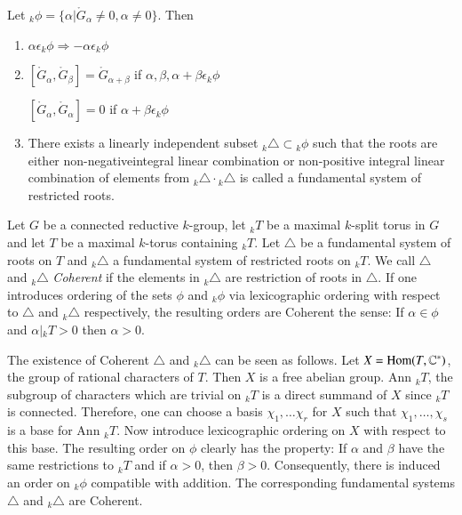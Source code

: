 \begin{thm}\label{chap0:thm0.11} %
  Let ${}_k \phi= \{ \alpha \big| \ring{G}_\alpha \neq 0, \alpha \neq 0
  \}$. Then
  \begin{enumerate}[\rm 1.]
    \item $\alpha \epsilon_k \phi \Rightarrow - \alpha
      \epsilon_k \phi$
      \item $\left[\ring{G}_\alpha, \ring{G}_\beta \right] =
        \ring{G}_{\alpha + \beta}$ if $\alpha, \beta, \alpha + \beta
        \epsilon_k \phi$

        $\left[\ring{G}_\alpha, \ring{G}_\alpha \right]=0$ if $\alpha
        + \beta \epsilon_k \phi$
        \item There exists a linearly independent subset ${}_k
          \triangle \subset {}_k \phi$ such that the roots are either
          non-negative\pageoriginale integral linear combination or non-positive
          integral linear combination of elements from ${}_k \triangle
          \cdot {}_k \triangle$ is called a fundamental system of
          restricted roots.
  \end{enumerate}
\end{thm}

Let $G$ be a connected reductive $k$-group, let ${}_k T$ be a maximal
$k$-split torus in $G$ and let $T$ be a maximal $k$-torus containing
${}_k T$. Let $\triangle$ be a fundamental system of roots on $T$ and
${}_k \triangle$ a fundamental system of restricted roots on ${}_k T$. We
call $\triangle$ and ${}_k \triangle$ \textit{Coherent} if the elements
in ${}_k \triangle$ are restriction of roots in $\triangle$. If one
introduces ordering of the sets $\phi$ and ${}_k \phi$ via lexicographic
ordering with respect to $\triangle$ and ${}_k \triangle$ respectively,
the resulting orders are Coherent the sense: If $\alpha \in
\phi$ and $\alpha \big| {}_k T > 0$ then $\alpha > 0$.

The existence of Coherent $\triangle$ and ${}_k \triangle$ can be seen as
follows. Let $X= \operatorname{Hom} (T, \mathbb{C}^*)$, the group of rational
characters of $T$. Then $X$ is a free abelian group. Ann ${}_k T$, the
subgroup of characters which are trivial on ${}_k T$ is a direct summand
of $X$ since ${}_k T$ is connected. Therefore, one can choose a basis
$\chi_1, \ldots \chi_r$ for $X$ such that $\chi_1 , \ldots , \chi_s$
is a base for Ann ${}_k T$. Now introduce lexicographic ordering on $X$
with respect to this base. The resulting order on $\phi$ clearly has
the property: If $\alpha$ and $\beta$ have the same restrictions to
${}_k T$ and if $\alpha > 0$, then $\beta> 0$. Consequently, there is
induced an order on ${}_k \phi$ compatible with addition. The
corresponding fundamental systems $\triangle$ and ${}_k \triangle$ are
Coherent. 

